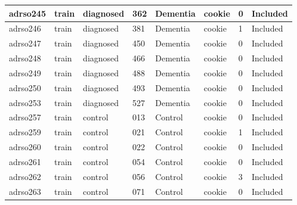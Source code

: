 \begin{center}
\begin{longtable}{|l|l|l|l|l|l|l|l|}
adrso245       & train                 & diagnosed         & 362                & Dementia             & cookie          & 0                & Included      \\ \hline
adrso246       & train                 & diagnosed         & 381                & Dementia             & cookie          & 1                & Included      \\ \hline
adrso247       & train                 & diagnosed         & 450                & Dementia             & cookie          & 0                & Included      \\ \hline
adrso248       & train                 & diagnosed         & 466                & Dementia             & cookie          & 0                & Included      \\ \hline
adrso249       & train                 & diagnosed         & 488                & Dementia             & cookie          & 0                & Included      \\ \hline
adrso250       & train                 & diagnosed         & 493                & Dementia             & cookie          & 0                & Included      \\ \hline
adrso253       & train                 & diagnosed         & 527                & Dementia             & cookie          & 0                & Included      \\ \hline
adrso257       & train                 & control           & 013                & Control              & cookie          & 0                & Included      \\ \hline
adrso259       & train                 & control           & 021                & Control              & cookie          & 1                & Included      \\ \hline
adrso260       & train                 & control           & 022                & Control              & cookie          & 0                & Included      \\ \hline
adrso261       & train                 & control           & 054                & Control              & cookie          & 0                & Included      \\ \hline
adrso262       & train                 & control           & 056                & Control              & cookie          & 3                & Included      \\ \hline
adrso263       & train                 & control           & 071                & Control              & cookie          & 0                & Included      \\ \hline

\end{longtable}
\end{center}
